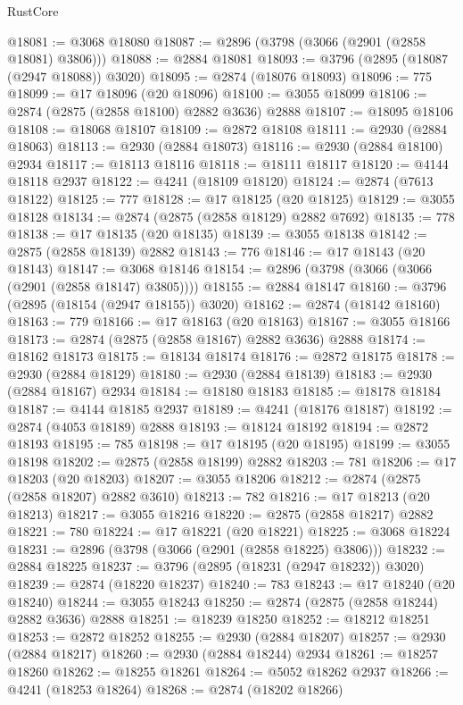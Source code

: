 \begin{lexlean}{RustCore}
\begin{coremodule}
@18081 := @3068 @18080
@18087 := @2896 (@3798 (@3066 (@2901 (@2858 @18081) @3806)))
@18088 := @2884 @18081
@18093 := @3796 (@2895 (@18087 (@2947 @18088)) @3020)
@18095 := @2874 (@18076 @18093)
@18096 := 775
@18099 := @17 @18096 (@20 @18096)
@18100 := @3055 @18099
@18106 := @2874 (@2875 (@2858 @18100) @2882 @3636) @2888
@18107 := @18095 @18106
@18108 := @18068 @18107
@18109 := @2872 @18108
@18111 := @2930 (@2884 @18063)
@18113 := @2930 (@2884 @18073)
@18116 := @2930 (@2884 @18100) @2934
@18117 := @18113 @18116
@18118 := @18111 @18117
@18120 := @4144 @18118 @2937
@18122 := @4241 (@18109 @18120)
@18124 := @2874 (@7613 @18122)
@18125 := 777
@18128 := @17 @18125 (@20 @18125)
@18129 := @3055 @18128
@18134 := @2874 (@2875 (@2858 @18129) @2882 @7692)
@18135 := 778
@18138 := @17 @18135 (@20 @18135)
@18139 := @3055 @18138
@18142 := @2875 (@2858 @18139) @2882
@18143 := 776
@18146 := @17 @18143 (@20 @18143)
@18147 := @3068 @18146
@18154 := @2896 (@3798 (@3066 (@3066 (@2901 (@2858 @18147) @3805))))
@18155 := @2884 @18147
@18160 := @3796 (@2895 (@18154 (@2947 @18155)) @3020)
@18162 := @2874 (@18142 @18160)
@18163 := 779
@18166 := @17 @18163 (@20 @18163)
@18167 := @3055 @18166
@18173 := @2874 (@2875 (@2858 @18167) @2882 @3636) @2888
@18174 := @18162 @18173
@18175 := @18134 @18174
@18176 := @2872 @18175
@18178 := @2930 (@2884 @18129)
@18180 := @2930 (@2884 @18139)
@18183 := @2930 (@2884 @18167) @2934
@18184 := @18180 @18183
@18185 := @18178 @18184
@18187 := @4144 @18185 @2937
@18189 := @4241 (@18176 @18187)
@18192 := @2874 (@4053 @18189) @2888
@18193 := @18124 @18192
@18194 := @2872 @18193
@18195 := 785
@18198 := @17 @18195 (@20 @18195)
@18199 := @3055 @18198
@18202 := @2875 (@2858 @18199) @2882
@18203 := 781
@18206 := @17 @18203 (@20 @18203)
@18207 := @3055 @18206
@18212 := @2874 (@2875 (@2858 @18207) @2882 @3610)
@18213 := 782
@18216 := @17 @18213 (@20 @18213)
@18217 := @3055 @18216
@18220 := @2875 (@2858 @18217) @2882
@18221 := 780
@18224 := @17 @18221 (@20 @18221)
@18225 := @3068 @18224
@18231 := @2896 (@3798 (@3066 (@2901 (@2858 @18225) @3806)))
@18232 := @2884 @18225
@18237 := @3796 (@2895 (@18231 (@2947 @18232)) @3020)
@18239 := @2874 (@18220 @18237)
@18240 := 783
@18243 := @17 @18240 (@20 @18240)
@18244 := @3055 @18243
@18250 := @2874 (@2875 (@2858 @18244) @2882 @3636) @2888
@18251 := @18239 @18250
@18252 := @18212 @18251
@18253 := @2872 @18252
@18255 := @2930 (@2884 @18207)
@18257 := @2930 (@2884 @18217)
@18260 := @2930 (@2884 @18244) @2934
@18261 := @18257 @18260
@18262 := @18255 @18261
@18264 := @5052 @18262 @2937
@18266 := @4241 (@18253 @18264)
@18268 := @2874 (@18202 @18266)

\end{coremodule}
\end{lexlean}
